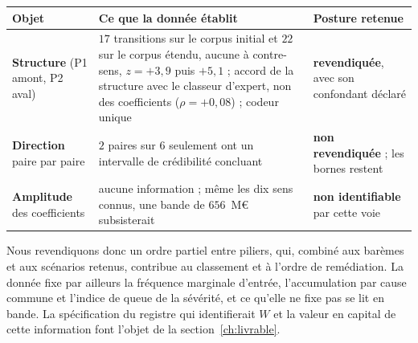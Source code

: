 \begin{center}\small
\renewcommand{\arraystretch}{1.3}
\begin{tabular}{@{}p{3.2cm} p{7.4cm} p{4.2cm}@{}}
\toprule
\textbf{Objet} & \textbf{Ce que la donnée établit} & \textbf{Posture retenue} \\
\midrule
\textbf{Structure} \newline (P1 amont, P2 aval) &
$17$ transitions sur le corpus initial et $22$ sur le corpus étendu, aucune à contre-sens,
$z=+3{,}9$ puis $+5{,}1$ ; accord de la structure avec le classeur d'expert, non des coefficients ($\rho=+0{,}08$) ; codeur unique &
\textbf{revendiquée}, avec son confondant déclaré \\
\textbf{Direction} \newline paire par paire &
$2$ paires sur $6$ seulement ont un intervalle de crédibilité concluant &
\textbf{non revendiquée} ; les bornes restent \\
\textbf{Amplitude} \newline des coefficients &
aucune information ; même les dix sens connus, une bande de $656$~M\euro{} subsisterait &
\textbf{non identifiable} par cette voie \\
\bottomrule
\end{tabular}
\end{center}

\vspace{4pt}
\noindent Nous revendiquons donc un ordre partiel entre piliers, qui, combiné aux barèmes et aux scénarios retenus, contribue au classement et à l'ordre de remédiation. La donnée fixe par
ailleurs la fréquence marginale d'entrée, l'accumulation par cause commune et l'indice de queue de la
sévérité, et ce qu'elle ne fixe pas se lit en bande. La spécification du registre qui identifierait $W$ et
la valeur en capital de cette information font l'objet de la section~\ref{ch:livrable}.

